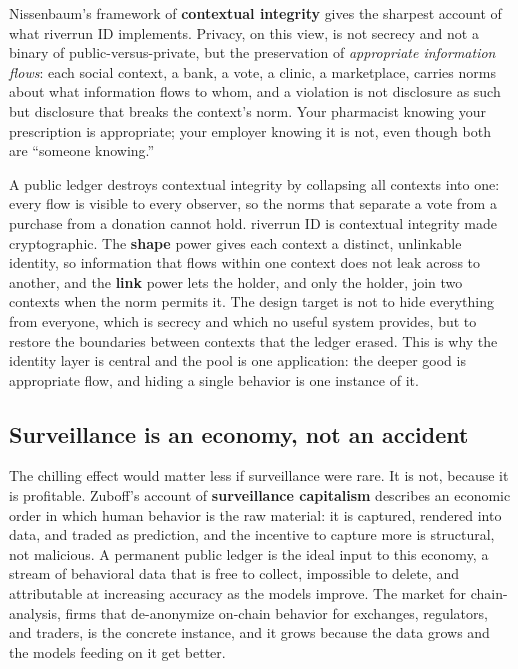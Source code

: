 \documentclass[11pt]{article}
\begin{document}
Nissenbaum's framework of \textbf{contextual integrity} \cite{nissenbaum} gives the
sharpest account of what riverrun ID implements. Privacy, on this view, is not secrecy and
not a binary of public-versus-private, but the preservation of \emph{appropriate
information flows}: each social context, a bank, a vote, a clinic, a marketplace, carries
norms about what information flows to whom, and a violation is not disclosure as such but
disclosure that breaks the context's norm. Your pharmacist knowing your prescription is
appropriate; your employer knowing it is not, even though both are ``someone knowing.''

A public ledger destroys contextual integrity by collapsing all contexts into one: every
flow is visible to every observer, so the norms that separate a vote from a purchase from a
donation cannot hold. riverrun ID is contextual integrity made cryptographic. The
\textbf{shape} power gives each context a distinct, unlinkable identity, so information
that flows within one context does not leak across to another, and the \textbf{link} power
lets the holder, and only the holder, join two contexts when the norm permits it. The
design target is not to hide everything from everyone, which is secrecy and which no useful
system provides, but to restore the boundaries between contexts that the ledger erased.
This is why the identity layer is central and the pool is one application: the deeper good
is appropriate flow, and hiding a single behavior is one instance of it.

\subsection{Surveillance is an economy, not an accident}

The chilling effect would matter less if surveillance were rare. It is not, because it is
profitable. Zuboff's account of \textbf{surveillance capitalism} \cite{zuboff} describes
an economic order in which human behavior is the raw material: it is captured, rendered
into data, and traded as prediction, and the incentive to capture more is structural, not
malicious. A permanent public ledger is the ideal input to this economy, a stream of
behavioral data that is free to collect, impossible to delete, and attributable at
increasing accuracy as the models improve. The market for chain-analysis, firms that
de-anonymize on-chain behavior for exchanges, regulators, and traders, is the concrete
instance, and it grows because the data grows and the models feeding on it get better.
\end{document}
